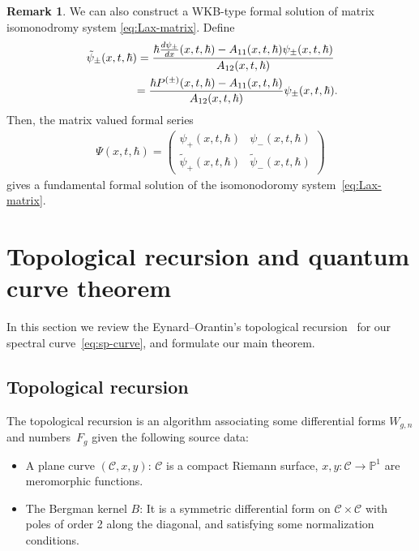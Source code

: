\documentclass[11pt]{article}
\theoremstyle{definition}
\newtheorem{rem}[thm]{Remark}
\numberwithin{equation}{section}
\begin{document}
\begin{rem}
We can also construct a WKB-type formal solution
of matrix isomonodromy system \eqref{eq:Lax-matrix}.
Def\/ine
\begin{gather*}
\tilde{\psi}_{\pm}(x,t,\hbar)   =
\frac{ \hbar \frac{d \psi_{\pm}}{dx}(x,t,\hbar) - A_{11}(x,t,\hbar)
\psi_{\pm}(x,t,\hbar)}{A_{12}(x,t,\hbar)}  \\
\hphantom{\tilde{\psi}_{\pm}(x,t,\hbar) }{}
  =
\frac{\hbar P^{(\pm)}(x,t,\hbar) - A_{11}(x,t,\hbar)}
{A_{12}(x,t,\hbar)} \psi_{\pm}(x,t,\hbar).
\end{gather*}
Then, the matrix valued formal series
\begin{gather} \label{eq:WKB-IM-mat}
\Psi(x,t,\hbar)   =
\begin{pmatrix}
\psi_{+}(x,t,\hbar) & \psi_{-}(x,t,\hbar) \\[+.7em]
\tilde{\psi}_{+}(x,t,\hbar) & \tilde{\psi}_{-}(x,t,\hbar)
\end{pmatrix}
\end{gather}
gives a fundamental formal solution of the
isomonodoromy system~\eqref{eq:Lax-matrix}.
\end{rem}

\section{Topological recursion and quantum curve theorem}\label{section3}

In this section we review the Eynard--Orantin's
topological recursion~\cite{EO07} for our
spectral cur\-ve~\eqref{eq:sp-curve},
and formulate our main theorem.

\subsection{Topological recursion}
\label{section:top-recursion}

The topological recursion is an algorithm associating some
dif\/ferential forms $W_{g,n}$ and num\-bers~$F_{g}$
given the following source data:
\begin{itemize}\itemsep=0pt
\item
A plane curve $({\mathcal C}, x, y)$: ${\mathcal C}$ is a
compact Riemann surface, $x, y\colon {\mathcal C} \rightarrow {\mathbb P}^{1}$
are meromorphic functions.
\item
The Bergman kernel $B$:
It is a symmetric dif\/ferential form on ${\mathcal C} \times {\mathcal C}$
with poles of order 2 along the diagonal, and
satisfying some normalization conditions.
\end{itemize}
\end{document}
